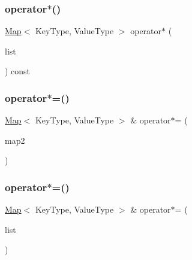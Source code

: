 \mbox{\label{classMap_afe04702252ed63484b973ce6ee66c8c5}} 
\subsubsection{\texorpdfstring{operator$\ast$()}{operator*()}\hspace{0.1cm}{\footnotesize\ttfamily [2/2]}}
{\footnotesize\ttfamily \mbox{\hyperlink{classMap}{Map}}$<$ Key\+Type, Value\+Type $>$ operator$\ast$ (\begin{DoxyParamCaption}\item[{std\+::initializer\+\_\+list$<$ std\+::pair$<$ Key\+Type, Value\+Type $>$ $>$}]{list }\end{DoxyParamCaption}) const}

\mbox{\label{classMap_a5d455253cf7b430025844b814f60f81d}} 
\subsubsection{\texorpdfstring{operator$\ast$=()}{operator*=()}\hspace{0.1cm}{\footnotesize\ttfamily [1/2]}}
{\footnotesize\ttfamily \mbox{\hyperlink{classMap}{Map}}$<$ Key\+Type, Value\+Type $>$ \& operator$\ast$= (\begin{DoxyParamCaption}\item[{const \mbox{\hyperlink{classMap}{Map}}$<$ Key\+Type, Value\+Type $>$ \&}]{map2 }\end{DoxyParamCaption})}

\mbox{\label{classMap_a08c8874c72372169781e46a36bab97a5}} 
\subsubsection{\texorpdfstring{operator$\ast$=()}{operator*=()}\hspace{0.1cm}{\footnotesize\ttfamily [2/2]}}
{\footnotesize\ttfamily \mbox{\hyperlink{classMap}{Map}}$<$ Key\+Type, Value\+Type $>$ \& operator$\ast$= (\begin{DoxyParamCaption}\item[{std\+::initializer\+\_\+list$<$ std\+::pair$<$ Key\+Type, Value\+Type $>$ $>$}]{list }\end{DoxyParamCaption})}


